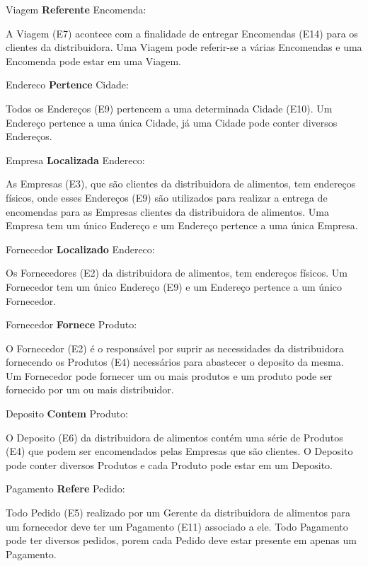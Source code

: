 \documentclass[12pt, onecolumn, titlepage]{article}
\begin{document}
\begin{description}
\item Viagem \textbf{Referente} Encomenda: 
\item \qquad A Viagem (E7) acontece com a finalidade de entregar Encomendas (E14) para os clientes da distribuidora. Uma Viagem pode referir-se a várias Encomendas e uma Encomenda pode estar em uma Viagem.

\item Endereco \textbf{Pertence} Cidade: 
\item \qquad Todos os Endereços (E9) pertencem a uma determinada Cidade (E10). Um Endereço pertence a uma única Cidade, já uma Cidade pode conter diversos Endereços.

\item Empresa \textbf{Localizada} Endereco: 
\item \qquad As Empresas (E3), que são clientes da distribuidora de alimentos, tem endereços físicos, onde esses Endereços (E9) são utilizados para realizar a entrega de encomendas para as Empresas clientes da distribuidora de alimentos. Uma Empresa tem um único Endereço e um Endereço pertence a uma única Empresa.

\item Fornecedor \textbf{Localizado} Endereco: 
\item \qquad Os Fornecedores (E2) da distribuidora de alimentos, tem endereços físicos. Um Fornecedor tem um único Endereço (E9) e um Endereço pertence a um único Fornecedor.

\item Fornecedor \textbf{Fornece} Produto: 
\item \qquad O Fornecedor (E2) é o responsável por suprir as necessidades da distribuidora fornecendo os Produtos (E4) necessários para abastecer o deposito da mesma. Um Fornecedor pode fornecer um ou mais produtos e um produto pode ser fornecido por um ou mais distribuidor.

\item Deposito \textbf{Contem} Produto: 
\item \qquad O Deposito (E6) da distribuidora de alimentos contém uma série de Produtos (E4) que podem ser encomendados pelas Empresas que são clientes. O Deposito pode conter diversos Produtos e cada Produto pode estar em um Deposito.

\item Pagamento \textbf{Refere} Pedido: 
\item \qquad Todo Pedido (E5) realizado por um Gerente da distribuidora de alimentos para um fornecedor deve ter um Pagamento (E11) associado a ele. Todo Pagamento pode ter diversos pedidos, porem cada Pedido deve estar presente em apenas um Pagamento.


\end{description}
\end{document}
